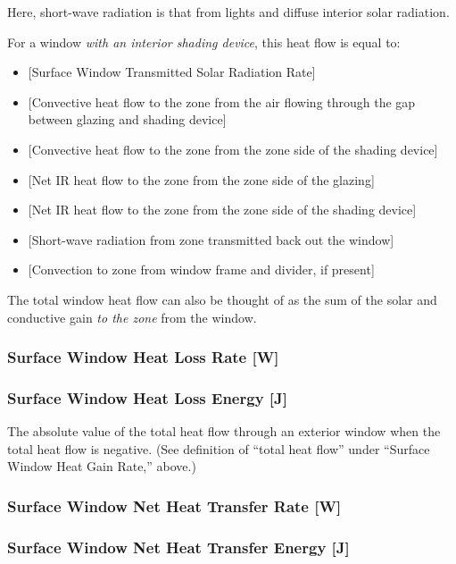 Here, short-wave radiation is that from lights and diffuse interior solar radiation.

For a window \emph{with an interior shading device}, this heat flow is equal to:


\begin{itemize}
\item
  {[}Surface Window Transmitted Solar Radiation Rate{]}
\item
  {[}Convective heat flow to the zone from the air flowing through the gap between glazing and shading device{]}
\item
  {[}Convective heat flow to the zone from the zone side of the shading device{]}
\item
  {[}Net IR heat flow to the zone from the zone side of the glazing{]}
\item
  {[}Net IR heat flow to the zone from the zone side of the shading device{]}
\item
  {[}Short-wave radiation from zone transmitted back out the window{]}
\item
  {[}Convection to zone from window frame and divider, if present{]}
\end{itemize}

The total window heat flow can also be thought of as the sum of the solar and conductive gain \emph{to the zone} from the window.

\subsubsection{Surface Window Heat Loss Rate {[}W{]}}\label{surface-window-heat-loss-rate-w}

\subsubsection{Surface Window Heat Loss Energy {[}J{]}}\label{surface-window-heat-loss-energy-j}

The absolute value of the total heat flow through an exterior window when the total heat flow is negative. (See definition of ``total heat flow'' under ``Surface Window Heat Gain Rate,'' above.)

\subsubsection{Surface Window Net Heat Transfer Rate {[}W{]}}\label{surface-window-net-heat-transfer-rate-w}

\subsubsection{Surface Window Net Heat Transfer Energy {[}J{]}}\label{surface-window-net-heat-transfer-rate-j}

